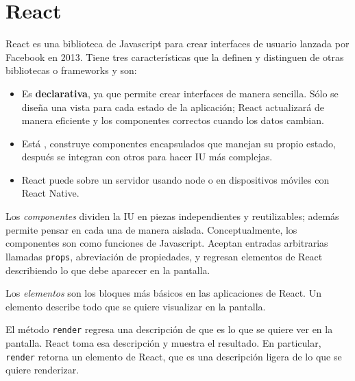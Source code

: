 

\section*{React}


React es una biblioteca de Javascript para crear interfaces de usuario
lanzada por Facebook en 2013.
Tiene tres características que la definen y distinguen  de otras
bibliotecas o frameworks y son:
\begin{itemize}
\item {} 
Es \textbf{declarativa}, ya que permite crear interfaces de manera sencilla. Sólo se diseña una vista para cada estado de la aplicación; React actualizará de manera eficiente y  los componentes correctos cuando los datos cambian.

\item {} 
Está , construye componentes encapsulados que manejan su propio estado, después se integran con otros para hacer IU más complejas.

\item {} 
React puede  sobre un servidor usando node o en dispositivos móviles con React Native.

\end{itemize}


Los \textit{componentes} dividen la IU en piezas independientes y reutilizables; además
permite pensar en cada una de manera aislada.
Conceptualmente, los componentes son como funciones de Javascript. Aceptan
entradas arbitrarias llamadas \texttt{props}, abreviación de propiedades, y regresan elementos
de React describiendo lo que debe aparecer en la pantalla.

Los \textit{elementos} son los bloques más básicos en las aplicaciones de React. Un elemento
describe todo que se quiere visualizar en la pantalla.

%
\begin{sphinxVerbatim}[commandchars=\\\{\}]
    
\end{sphinxVerbatim}


El método \texttt{render} regresa una descripción
de que es lo que se quiere ver en la pantalla. React
toma esa descripción y muestra el resultado. En
particular, \texttt{render} retorna un elemento de React,
que es una descripción ligera de lo que se quiere 
renderizar.

